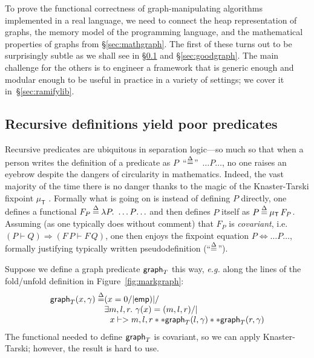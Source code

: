 To prove the functional correctness of graph-manipulating algorithms implemented in a real language, we need to connect the heap representation of graphs, the memory model of the programming language, and the mathematical properties of graphs from \S\ref{sec:mathgraph}.  The first of these turns out to be surprisingly subtle as we shall see in \S\ref{sec:fixpointfail} and \S\ref{sec:goodgraph}.  The main challenge for the others is to engineer a framework that is generic enough and modular enough to be useful in practice in a variety of settings; we cover it in~\S\ref{sec:ramifylib}.

\subsection{Recursive definitions yield poor  predicates}\label{sec:fixpointfail}

\newcommand{\graphkt}{\p{graph}_T}
\newcommand{\grapham}{\p{graph}_A}

Recursive predicates are ubiquitous in separation logic---so
much so that when a person writes the definition of a predicate as
\mbox{$P$ ``$\mathbin{\stackrel{\Delta}{=}}$'' $\ldots P \! \ldots$}, no one raises an eyebrow despite the
dangers of circularity in mathematics. Indeed, the vast majority of the time there
is no danger thanks to the magic of the Knaster-Tarski fixpoint
$\mu_{\mathsf{T}}$ \cite{tarski:fixpoint}.  Formally what is going on
is instead of defining $P$ directly, one defines a functional
\mbox{$F_P \mathbin{\stackrel{\Delta}{=}} \lambda P.~ \ldots P \! \ldots$} and then defines $P$ itself as
\mbox{$P \mathbin{\stackrel{\Delta}{=}} \mu_{\mathsf{T}} \, F_P$}.  Assuming (as one typically does
without comment) that $F_P$ is \emph{covariant}, i.e. $(P \vdash Q)
\Rightarrow (F \, P \vdash F \, Q)$, one then enjoys the fixpoint
equation $P \Leftrightarrow \ldots P \ldots$, formally justifying
typically written pseudodefinition (``$\mathbin{\stackrel{\Delta}{=}}$'').


Suppose we define a graph predicate $\graphkt$ this way, \emph{e.g.} along the lines of the fold/unfold definition in Figure~\ref{fig:markgraph}: %
\vspace{-1ex}
\[
\begin{array}{@{}l@{}l@{}}
\graphkt(x, \gamma) \stackrel{\Delta}{=} & (x = 0 /| \p{emp}) |/ \null \\
& \exists m,l,r.~ \gamma(x)=(m,l,r) /| \null \\
& ~~  x |-> m,l,r ** \graphkt(l, \gamma) ** \graphkt(r, \gamma)
\end{array}
\vspace{-1ex}
\]
The functional needed to define $\graphkt$ is covariant, so we can apply Knaster-Tarski; however, the result is hard to use.

